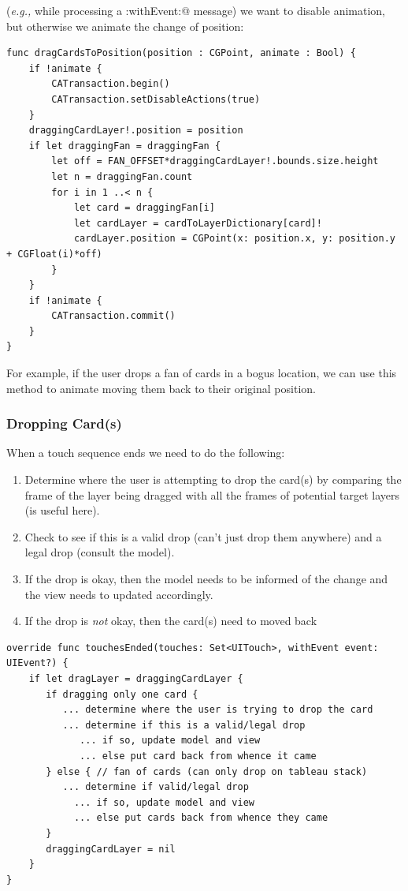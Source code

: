 \documentclass[11pt]{article}
\begin{document}
({\it e.g.,} while processing a \verb@touchesMoved:withEvent:@ message)
we want to disable animation, 
but otherwise we animate the change of position:
\begin{verbatim}
func dragCardsToPosition(position : CGPoint, animate : Bool) {
    if !animate {
        CATransaction.begin()
        CATransaction.setDisableActions(true)
    }
    draggingCardLayer!.position = position
    if let draggingFan = draggingFan {
        let off = FAN_OFFSET*draggingCardLayer!.bounds.size.height
        let n = draggingFan.count
        for i in 1 ..< n {
            let card = draggingFan[i]
            let cardLayer = cardToLayerDictionary[card]!
            cardLayer.position = CGPoint(x: position.x, y: position.y + CGFloat(i)*off)
        }
    }
    if !animate {
        CATransaction.commit()
    }
}
\end{verbatim}
For example, if the user drops a fan of cards in a bogus location, we can
use this method to animate moving them back to their original position.

\subsubsection{Dropping Card(s)}

When a touch sequence ends we need to do the following:
\begin{enumerate}
\item Determine where the user is attempting to drop
  the card(s) by comparing the frame of
  the layer being dragged with all the frames of potential target layers
  (\verb@CGRectIntersectsRect@ is useful here).
\item Check to see if this is a valid drop (can't just drop them anywhere) 
  and a legal drop (consult the model).
\item If the drop is okay, then the model needs to be informed of the change
  and the view needs to updated accordingly.
\item If the drop is {\em not} okay, then the card(s) need to moved back
\end{enumerate}
\begin{verbatim}
override func touchesEnded(touches: Set<UITouch>, withEvent event: UIEvent?) {
    if let dragLayer = draggingCardLayer {
       if dragging only one card {
          ... determine where the user is trying to drop the card
          ... determine if this is a valid/legal drop
             ... if so, update model and view
             ... else put card back from whence it came
       } else { // fan of cards (can only drop on tableau stack)
          ... determine if valid/legal drop
            ... if so, update model and view
            ... else put cards back from whence they came
       }
       draggingCardLayer = nil
    }
}
\end{verbatim}
\end{document}
